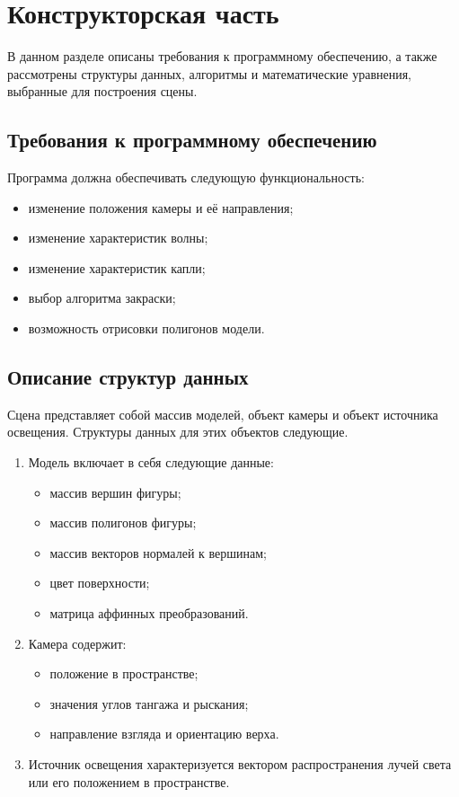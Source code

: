 \chapter{Конструкторская часть}

В данном разделе описаны требования к программному обеспечению, а также рассмотрены структуры данных, алгоритмы и математические уравнения, выбранные для построения сцены.

\section{Требования к программному обеспечению}

Программа должна обеспечивать следующую функциональность:
\begin{itemize}[label*=---]
    \item изменение положения камеры и её направления;
    \item изменение характеристик волны;
    \item изменение характеристик капли;
    \item выбор алгоритма закраски;
    \item возможность отрисовки полигонов модели.
\end{itemize}

\section{Описание структур данных}

Сцена представляет собой массив моделей, объект камеры и объект источника освещения.  
Структуры данных для этих объектов следующие.

\begin{enumerate}
	\item Модель включает в себя следующие данные:
	\begin{itemize}
		\item массив вершин фигуры;
		\item массив полигонов фигуры;
		\item массив векторов нормалей к вершинам;
		\item цвет поверхности;
		\item матрица аффинных преобразований.
	\end{itemize}
	\item Камера содержит:
	\begin{itemize}
		\item положение в пространстве;
		\item значения углов тангажа и рыскания;
		\item направление взгляда и ориентацию верха.
	\end{itemize}
	\item Источник освещения характеризуется вектором распространения лучей света или его положением в пространстве.
\end{enumerate}



